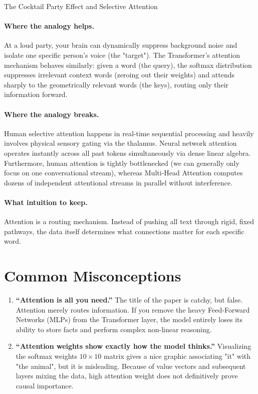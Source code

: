 \begin{analogybox}{The Cocktail Party Effect and Selective Attention}
  \paragraph{Where the analogy helps.}
  At a loud party, your brain can dynamically suppress background noise and isolate one specific person's voice (the "target"). The Transformer's attention mechanism behaves similarly: given a word (the query), the softmax distribution suppresses irrelevant context words (zeroing out their weights) and attends sharply to the geometrically relevant words (the keys), routing only their information forward.

  \paragraph{Where the analogy breaks.}
  Human selective attention happens in real-time sequential processing and heavily involves physical sensory gating via the thalamus. Neural network attention operates instantly across all past tokens simultaneously via dense linear algebra. Furthermore, human attention is tightly bottlenecked (we can generally only focus on one conversational stream), whereas Multi-Head Attention computes dozens of independent attentional streams in parallel without interference.

  \paragraph{What intuition to keep.}
  Attention is a routing mechanism. Instead of pushing all text through rigid, fixed pathways, the data itself determines what connections matter for each specific word.
\end{analogybox}


\section{Common Misconceptions}
\label{ch:09:sec:misconceptions}

\begin{enumerate}
  \item \textbf{``Attention is all you need.''} The title of the paper is catchy, but false. Attention merely routes information. If you remove the heavy Feed-Forward Networks (MLPs) from the Transformer layer, the model entirely loses its ability to store facts and perform complex non-linear reasoning. 
  \item \textbf{``Attention weights show exactly how the model thinks.''} Visualizing the softmax weights $10 \times 10$ matrix gives a nice graphic associating "it" with "the animal", but it is misleading. Because of value vectors and subsequent layers mixing the data, high attention weight does not definitively prove causal importance.
\end{enumerate}


